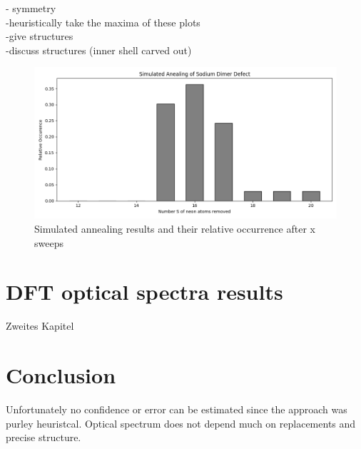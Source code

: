 - symmetry\\
-heuristically take the maxima of these plots \\
-give structures\\
-discuss structures (inner shell carved out)\\

\begin{figure}[h!]
	\centering
	\includegraphics[scale = 0.5]{Inhalt/Bilder/optimaldimer.png}
	\caption{Simulated annealing results and their relative occurrence after x sweeps}
	\label{fig:simulatedannealingsodiumdimer}
\end{figure}

\chapter{DFT optical spectra results}
\label{chap:Zweites Kapitel}
%
Zweites Kapitel
%
%
\chapter{Conclusion}
Unfortunately no confidence or error can be estimated since the approach was purley heuristcal. Optical spectrum does not depend much on replacements and precise structure.



